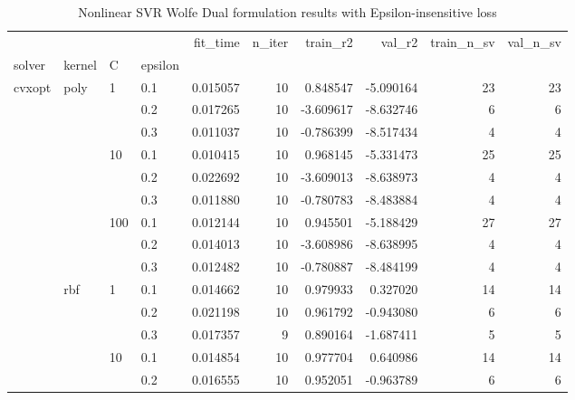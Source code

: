 \begin{table}[h!]
\centering
\caption{Nonlinear SVR Wolfe Dual formulation results with Epsilon-insensitive loss}
\label{nonlinear_dual_svr_cv_results}
\begin{tabular}{llllrrrrrr}
\toprule
       &     &     &     &     fit\_time &   n\_iter &  train\_r2 &     val\_r2 &  train\_n\_sv &  val\_n\_sv \\
solver & kernel & C & epsilon &              &          &           &            &             &           \\
\midrule
cvxopt & poly & 1   & 0.1 &     0.015057 &       10 &  0.848547 &  -5.090164 &          23 &        23 \\
       &     &     & 0.2 &     0.017265 &       10 & -3.609617 &  -8.632746 &           6 &         6 \\
       &     &     & 0.3 &     0.011037 &       10 & -0.786399 &  -8.517434 &           4 &         4 \\
       &     & 10  & 0.1 &     0.010415 &       10 &  0.968145 &  -5.331473 &          25 &        25 \\
       &     &     & 0.2 &     0.022692 &       10 & -3.609013 &  -8.638973 &           4 &         4 \\
       &     &     & 0.3 &     0.011880 &       10 & -0.780783 &  -8.483884 &           4 &         4 \\
       &     & 100 & 0.1 &     0.012144 &       10 &  0.945501 &  -5.188429 &          27 &        27 \\
       &     &     & 0.2 &     0.014013 &       10 & -3.608986 &  -8.638995 &           4 &         4 \\
       &     &     & 0.3 &     0.012482 &       10 & -0.780887 &  -8.484199 &           4 &         4 \\
       & rbf & 1   & 0.1 &     0.014662 &       10 &  0.979933 &   0.327020 &          14 &        14 \\
       &     &     & 0.2 &     0.021198 &       10 &  0.961792 &  -0.943080 &           6 &         6 \\
       &     &     & 0.3 &     0.017357 &        9 &  0.890164 &  -1.687411 &           5 &         5 \\
       &     & 10  & 0.1 &     0.014854 &       10 &  0.977704 &   0.640986 &          14 &        14 \\
       &     &     & 0.2 &     0.016555 &       10 &  0.952051 &  -0.963789 &           6 &         6 \\

\end{tabular}
\end{table}

